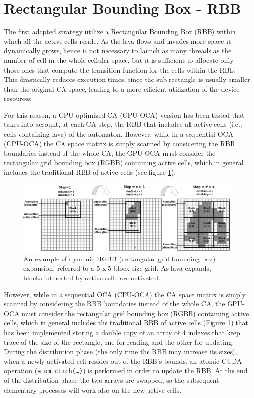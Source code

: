 \section{Rectangular Bounding Box - RBB}\label{sect:RBBOptimization}
The first adopted strategy utilize a Rectangular Bounding Box (RBB) within which
all the active cells reside. As the lava flows and invades more space it
dynamically grows, hence is not necessary to launch as many threads as the
number of cell in the whole cellular space, but it is sufficient to allocate
only those ones that compute the transition function for the cells within the
RBB.
This drastically reduces execution times, since the sub-rectangle is usually
smaller than the original CA space, leading to a more efficient utilization of
the device resources.


For this reason, a GPU optimized CA (GPU-OCA) version has
been tested that takes into account, at each CA step, the RBB
that includes all active cells (i.e., cells containing lava) of the
automaton. However, while in a sequential OCA (CPU-OCA)
the CA space matrix is simply scanned by considering the
RBB boundaries instead of the whole CA, the GPU-OCA must
consider the rectangular grid bounding box (RGBB) containing
active cells, which in general includes the traditional RBB of
active cells (see figure \ref{fig:RBB}).

\begin{figure}
\centering
  \includegraphics[scale=0.4]{./images/RBB}
  \caption{An example of dynamic RGBB (rectangular grid bounding box) expansion, referred to a 5 x 5 block size grid. As lava expands, blocks interested by
active cells are activated.}
  \label{fig:RBB}
\end{figure}

However, while in a sequential OCA (CPU-OCA) the CA space matrix is simply
scanned by considering the RBB boundaries instead of the whole CA, the GPU-OCA
must consider the rectangular grid bounding box (RGBB) containing active cells,
which in general includes the traditional RBB of active cells (Figure
\ref{fig:RBB}) that has been implemented storing a double copy of an array of 4
indexes that keep trace of the size of the rectangle, one for reading and the
other for updating.
During the distribution phase (the only time the RBB may increase its sizes),
when a newly activated cell resides out of the RBB's bounds, an atomic CUDA
operation (\texttt{atomicExch(\ldots)}) is performed in order to update the RBB.
At the end of the distribution phase the two arrays are swapped, so the subsequent
elementary processes will work also on the new active cells.

